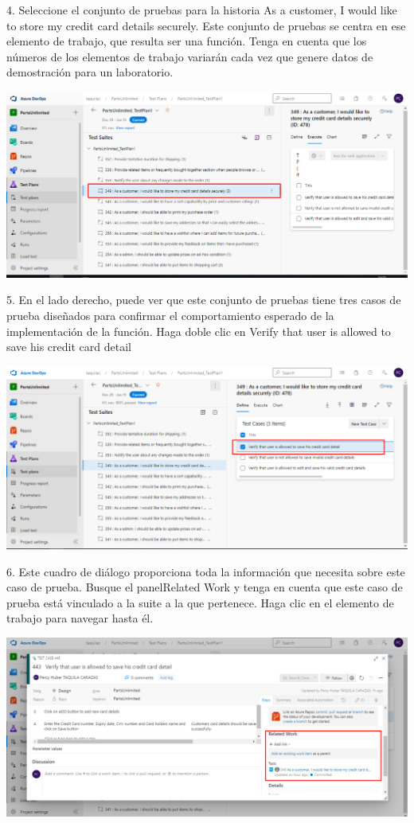 \documentclass[12pt,letterpaper]{article}
\begin{document}
4. Seleccione el conjunto de pruebas para la historia As a customer, I would like to store my credit card details securely. Este conjunto de pruebas se centra en ese elemento de trabajo, que resulta ser una función. Tenga en cuenta que los números de los elementos de trabajo variarán cada vez que genere datos de demostración para un laboratorio.

\begin{center}
		\includegraphics[width=15cm]{./Imagenes/3} 
\end{center}

5. En el lado derecho, puede ver que este conjunto de pruebas tiene tres casos de prueba diseñados para confirmar el comportamiento esperado de la implementación de la función. Haga doble clic en Verify that user is allowed to save his credit card detail

\begin{center}
		\includegraphics[width=15cm]{./Imagenes/4} 
\end{center}

6. Este cuadro de diálogo proporciona toda la información que necesita sobre este caso de prueba. Busque el panelRelated Work y tenga en cuenta que este caso de prueba está vinculado a la suite a la que pertenece. Haga clic en el elemento de trabajo para navegar hasta él.

\begin{center}
		\includegraphics[width=15cm]{./Imagenes/5} 
\end{center}
\end{document}
